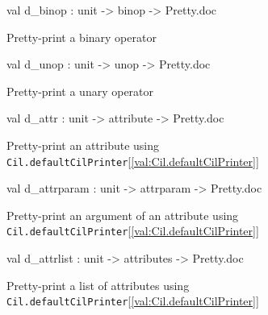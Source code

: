 \documentclass[11pt]{article}
\begin{document}
\label{val:Cil.d-underscorebinop}\begin{ocamldoccode}
val d_binop : unit -> binop -> Pretty.doc
\end{ocamldoccode}
\begin{ocamldocdescription}
Pretty-print a binary operator


\end{ocamldocdescription}




\label{val:Cil.d-underscoreunop}\begin{ocamldoccode}
val d_unop : unit -> unop -> Pretty.doc
\end{ocamldoccode}
\begin{ocamldocdescription}
Pretty-print a unary operator


\end{ocamldocdescription}




\label{val:Cil.d-underscoreattr}\begin{ocamldoccode}
val d_attr : unit -> attribute -> Pretty.doc
\end{ocamldoccode}
\begin{ocamldocdescription}
Pretty-print an attribute using {\tt{Cil.defaultCilPrinter}}[\ref{val:Cil.defaultCilPrinter}]


\end{ocamldocdescription}




\label{val:Cil.d-underscoreattrparam}\begin{ocamldoccode}
val d_attrparam : unit -> attrparam -> Pretty.doc
\end{ocamldoccode}
\begin{ocamldocdescription}
Pretty-print an argument of an attribute using {\tt{Cil.defaultCilPrinter}}[\ref{val:Cil.defaultCilPrinter}]


\end{ocamldocdescription}




\label{val:Cil.d-underscoreattrlist}\begin{ocamldoccode}
val d_attrlist : unit -> attributes -> Pretty.doc
\end{ocamldoccode}
\begin{ocamldocdescription}
Pretty-print a list of attributes using {\tt{Cil.defaultCilPrinter}}[\ref{val:Cil.defaultCilPrinter}]


\end{ocamldocdescription}
\end{document}
